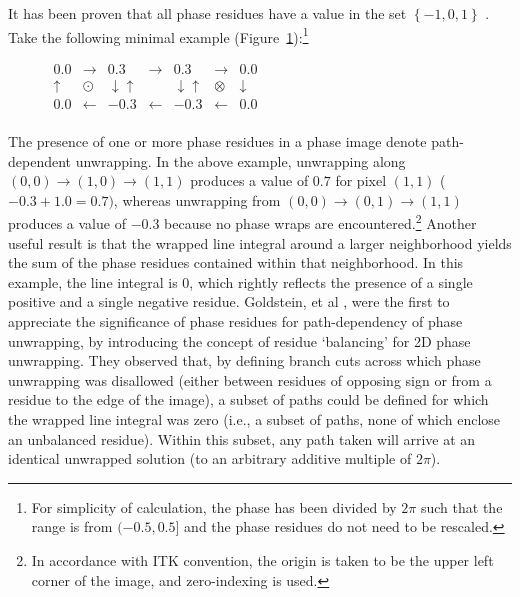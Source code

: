 It has been proven that all phase residues have a value in the set $\left \{ -1, 0, 1\right \}$ \cite{Bone1991}.  Take the following minimal example (Figure~\ref{fig:Phase_Residues}):\footnote{For simplicity of calculation, the phase has been divided by $2\pi$ such that the range is from $(-0.5, 0.5]$ and the phase residues do not need to be rescaled.}

\begin{figure}[h]
\center
$\begin{matrix}

0.0 &  \rightarrow  & 0.3  &  \rightarrow & 0.3  &  \rightarrow  & 0.0 \\
\uparrow &  \odot  & \downarrow \uparrow &  & \downarrow \uparrow & \otimes & \downarrow \\
0.0 & \leftarrow   & -0.3 & \leftarrow  & -0.3 &  \leftarrow  & 0.0 \\

\end{matrix}$

\label{fig:Phase_Residues}
\end{figure}

The presence of one or more phase residues in a phase image denote path-dependent unwrapping.  In the above example, unwrapping along $(0,0) \rightarrow (1,0) \rightarrow (1,1)$ produces a value of $0.7$ for pixel $(1,1)$ ($-0.3 + 1.0 = 0.7)$, whereas unwrapping from $(0,0) \rightarrow (0,1) \rightarrow (1,1)$ produces a value of $-0.3$ because no phase wraps are encountered.\footnote{In accordance with ITK convention, the origin is taken to be the upper left corner of the image, and zero-indexing is used.}  Another useful result is that the wrapped line integral around a larger neighborhood yields the sum of the phase residues contained within that neighborhood.  In this example, the line integral is 0, which rightly reflects the presence of a single positive and a single negative residue.  Goldstein, et al \cite{Goldstein1988}, were the first to appreciate the significance of phase residues for path-dependency of phase unwrapping, by introducing the concept of residue `balancing' for 2D phase unwrapping.  They observed that, by defining branch cuts across which phase unwrapping was disallowed (either between residues of opposing sign or from a residue to the edge of the image), a subset of paths could be defined for which the wrapped line integral was zero (i.e., a subset of paths, none of which enclose an unbalanced residue).  Within this subset, any path taken will arrive at an identical unwrapped solution (to an arbitrary additive multiple of $2\pi$).

